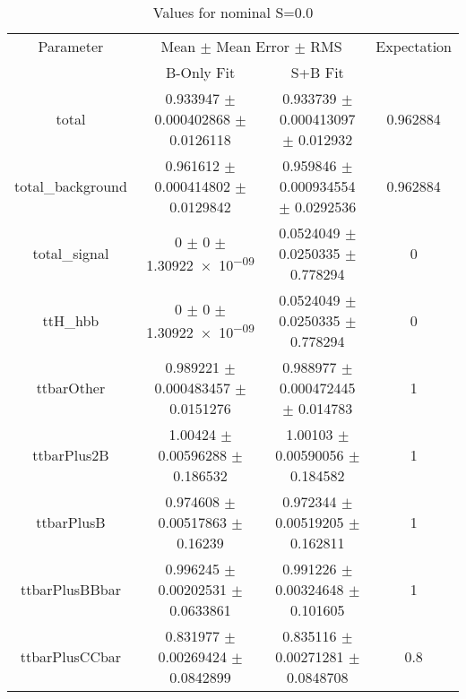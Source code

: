 \begin{table}
\centering
\caption{Values for nominal S=0.0}
\begin{tabular}{cccc}
\toprule
Parameter & \multicolumn{2}{c}{Mean $\pm$ Mean Error $\pm$ RMS} & Expectation\\
 & B-Only Fit & S+B Fit & \\
\midrule
total & \num{0.933947} $\pm$ \num{0.000402868} $\pm$ \num{0.0126118} & \num{0.933739} $\pm$ \num{0.000413097} $\pm$ \num{0.012932} & \num{0.962884}\\
total\_background & \num{0.961612} $\pm$ \num{0.000414802} $\pm$ \num{0.0129842} & \num{0.959846} $\pm$ \num{0.000934554} $\pm$ \num{0.0292536} & \num{0.962884}\\
total\_signal & \num{0} $\pm$ \num{0} $\pm$ \num{1.30922e-09} & \num{0.0524049} $\pm$ \num{0.0250335} $\pm$ \num{0.778294} & \num{0}\\
ttH\_hbb & \num{0} $\pm$ \num{0} $\pm$ \num{1.30922e-09} & \num{0.0524049} $\pm$ \num{0.0250335} $\pm$ \num{0.778294} & \num{0}\\
ttbarOther & \num{0.989221} $\pm$ \num{0.000483457} $\pm$ \num{0.0151276} & \num{0.988977} $\pm$ \num{0.000472445} $\pm$ \num{0.014783} & \num{1}\\
ttbarPlus2B & \num{1.00424} $\pm$ \num{0.00596288} $\pm$ \num{0.186532} & \num{1.00103} $\pm$ \num{0.00590056} $\pm$ \num{0.184582} & \num{1}\\
ttbarPlusB & \num{0.974608} $\pm$ \num{0.00517863} $\pm$ \num{0.16239} & \num{0.972344} $\pm$ \num{0.00519205} $\pm$ \num{0.162811} & \num{1}\\
ttbarPlusBBbar & \num{0.996245} $\pm$ \num{0.00202531} $\pm$ \num{0.0633861} & \num{0.991226} $\pm$ \num{0.00324648} $\pm$ \num{0.101605} & \num{1}\\
ttbarPlusCCbar & \num{0.831977} $\pm$ \num{0.00269424} $\pm$ \num{0.0842899} & \num{0.835116} $\pm$ \num{0.00271281} $\pm$ \num{0.0848708} & \num{0.8}\\
\bottomrule
\end{tabular}
\end{table}
